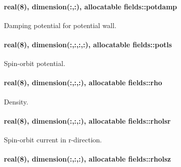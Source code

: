 \paragraph[{\texorpdfstring{potdamp}{potdamp}}]{\setlength{\rightskip}{0pt plus 5cm}real(8), dimension(\+:,\+:), allocatable fields\+::potdamp}\hypertarget{namespacefields_a4d199294340c50de239b3153fc1d8489}{}\label{namespacefields_a4d199294340c50de239b3153fc1d8489}


Damping potential for potential wall. 

\paragraph[{\texorpdfstring{potls}{potls}}]{\setlength{\rightskip}{0pt plus 5cm}real(8), dimension(\+:,\+:,\+:,\+:), allocatable fields\+::potls}\hypertarget{namespacefields_a2e7e890d4b19e3340f4c0bede50db496}{}\label{namespacefields_a2e7e890d4b19e3340f4c0bede50db496}


Spin-\/orbit potential. 

\paragraph[{\texorpdfstring{rho}{rho}}]{\setlength{\rightskip}{0pt plus 5cm}real(8), dimension(\+:,\+:,\+:), allocatable fields\+::rho}\hypertarget{namespacefields_a10b593797160d6003356db31c299e2a1}{}\label{namespacefields_a10b593797160d6003356db31c299e2a1}


Density. 

\paragraph[{\texorpdfstring{rholsr}{rholsr}}]{\setlength{\rightskip}{0pt plus 5cm}real(8), dimension(\+:,\+:,\+:), allocatable fields\+::rholsr}\hypertarget{namespacefields_ad34c4612788bfa1f20ad97d5182c7614}{}\label{namespacefields_ad34c4612788bfa1f20ad97d5182c7614}


Spin-\/orbit current in r-\/direction. 

\paragraph[{\texorpdfstring{rholsz}{rholsz}}]{\setlength{\rightskip}{0pt plus 5cm}real(8), dimension(\+:,\+:,\+:), allocatable fields\+::rholsz}\hypertarget{namespacefields_acd9b81a5e3e3061de1e548b3377edf43}{}\label{namespacefields_acd9b81a5e3e3061de1e548b3377edf43}


